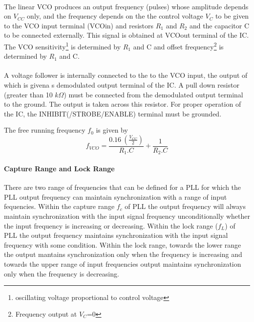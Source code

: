 \paragraph{} The linear VCO produces an output frequency (pulses) whose amplitude depends on $V_{CC}$ only,  and the frequency depends on the the control voltage $V_C$ to be given to the VCO input terminal (VCOin) and resistors $R_1$ and $R_2$ and the capacitor C to be connected externally. This signal is obtained at VCOout terminal of the IC. The VCO sensitivity\footnote{oscillating voltage proportional to control voltage} is determined by $R_1$  and C and offset frequency\footnote{Frequency output at $V_C$=0} is determined by $R_1$  and C.

\paragraph{} A voltage follower is internally connected to the to the VCO input, the output of which is givena s demodulated output terminal of the IC. A pull down resistor (greater than 10 $k\Omega$) must be connected from the demodulated output terminal  to the ground. The output is taken across this resistor. For proper operation of the IC, the INHIBIT(/STROBE/ENABLE) terminal must be grounded.

The free running frequency $f_0$ is given by 
\begin{equation}
\label{f0}
f_{VCO}=\frac{0.16\ ( \frac{V_{CC}}{2} )}{R_1.C}+\frac{1}{R_2.C}
\end{equation}

\paragraph{Capture Range and Lock Range}

There are two range of frequencies that can be defined for a PLL for which the PLL output frequency can maintain synchronization with a range of input fequencies.  Within the capture range $f_c$ of PLL the output frequency will always maintain synchronization with the input signal frequency unconditionally whether the input frequency is increasing or decreasing. Within the lock range ($f_L$) of PLL the output frequency maintains synchronization with the input signal frequency with some condition. Within the lock range, towards the lower range the output mantains synchronization only when the frequency is increasing and towards the upper range of input frequencies output maintains synchronization only when the frequency is decreasing.

